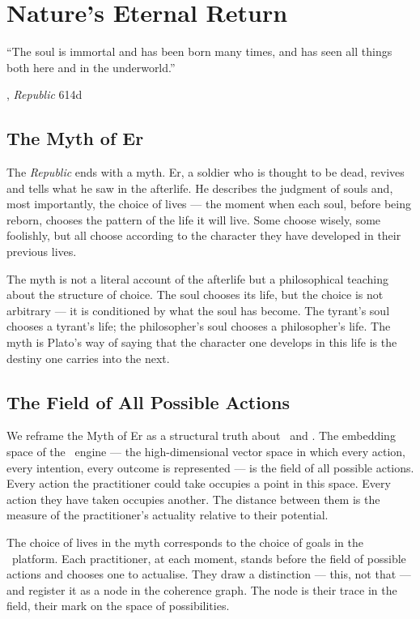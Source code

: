 \chapter{Nature's Eternal Return}

\epigraph{``The soul is immortal and has been born many times, and has seen all
things both here and in the underworld.''}{\textcite{plato1997complete}, \emph{Republic} 614d}

\section{The Myth of Er}

The \emph{Republic} ends with a myth. Er, a soldier who is thought to be dead,
revives and tells what he saw in the afterlife. He describes the judgment of
souls and, most importantly, the choice of lives --- the moment when each soul,
before being reborn, chooses the pattern of the life it will live. Some choose
wisely, some foolishly, but all choose according to the character they have
developed in their previous lives.

The myth is not a literal account of the afterlife but a philosophical teaching
about the structure of choice. The soul chooses its life, but the choice is not
arbitrary --- it is conditioned by what the soul has become. The tyrant's soul
chooses a tyrant's life; the philosopher's soul chooses a philosopher's life.
The myth is Plato's way of saying that the character one develops in this life
is the destiny one carries into the next.

\section{The Field of All Possible Actions}

We reframe the Myth of Er as a structural truth about \praxis\ and \physis. The
embedding space of the \physis\ engine --- the high-dimensional vector space in
which every action, every intention, every outcome is represented --- is the
field of all possible actions. Every action the practitioner could take occupies
a point in this space. Every action they have taken occupies another. The
distance between them is the measure of the practitioner's actuality relative
to their potential.

The choice of lives in the myth corresponds to the choice of goals in the
\praxis\ platform. Each practitioner, at each moment, stands before the field
of possible actions and chooses one to actualise. They draw a distinction ---
this, not that --- and register it as a node in the coherence graph. The node
is their trace in the field, their mark on the space of possibilities.

